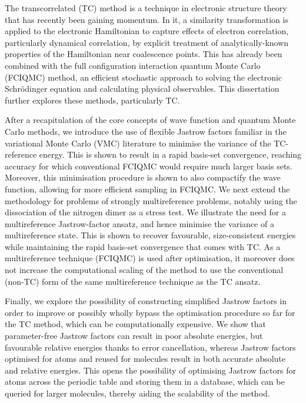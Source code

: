 The transcorrelated (TC) method is a technique in electronic structure theory that has recently been gaining momentum. In it, a similarity transformation is applied to the electronic Hamiltonian to capture effects of electron correlation, particularly dynamical correlation, by explicit treatment of analytically-known properties of the Hamiltonian near coalescence points. This has already been combined with the full configuration interaction quantum Monte Carlo (FCIQMC) method, an efficient stochastic approach to solving the electronic Schrödinger equation and calculating physical observables. This dissertation further explores these methods, particularly TC.

After a recapitulation of the core concepts of wave function and quantum Monte Carlo methods, we introduce the use of flexible Jastrow factors familiar in the variational Monte Carlo (VMC) literature to minimise the variance of the TC-reference energy. This is shown to result in a rapid basis-set convergence, reaching accuracy for which conventional FCIQMC would require much larger basis sets. Moreover, this minimisation procedure is shown to also compactify the wave function, allowing for more efficient sampling in FCIQMC. We next extend the methodology for problems of strongly multireference problems, notably using the dissociation of the nitrogen dimer as a stress test. We illustrate the need for a multireference Jastrow-factor ansatz, and hence minimise the variance of a multireference state. This is shown to recover favourable, size-consistent energies while maintaining the rapid basis-set convergence that comes with TC. As a multireference technique (FCIQMC) is used after optimisation, it moreover does not increase the computational scaling of the method to use the conventional (non-TC) form of the same multireference technique as the TC ansatz.

Finally, we explore the possibility of constructing simplified Jastrow factors in order to improve or possibly wholly bypass the optimisation procedure so far for the TC method, which can be computationally expensive. We show that parameter-free Jastrow factors can result in poor absolute energies, but favourable relative energies thanks to error cancellation, whereas Jastrow factors optimised for atoms and reused for molecules result in both accurate absolute and relative energies. This opens the possibility of optimising Jastrow factors for atoms across the periodic table and storing them in a database, which can be queried for larger molecules, thereby aiding the scalability of the method.
